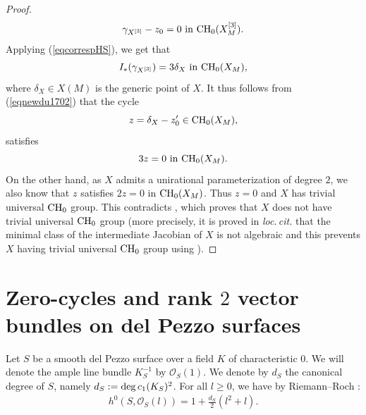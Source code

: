 \documentclass[10pt]{article}
\begin{document}
\begin{proof}
\begin{eqnarray}\label{eqnewdu1702} \gamma_{X^{[3]}}-z_0=0\,\,{\rm in}\,\,{\rm CH}_0(X^{[3]}_M).
\end{eqnarray}
Applying (\ref{eqcorrespHS}), we get that
$$I_*(\gamma_{X^{[3]}})=3\delta_X \,\,{\rm in}\,\,{\rm CH}_0(X_M),$$
where $\delta_X\in X(M)$ is the generic point of  $X$.
 It thus follows   from (\ref{eqnewdu1702})  that  the cycle
$$z=\delta_X-z'_0\in{\rm CH}_0(X_M),$$
  satisfies
$$3z=0\,\,{\rm in}\,\,{\rm CH}_0(X_M).$$ On the other hand, as $X$ admits a unirational parameterization of degree $2$, we also know that $z$ satisfies $2z=0$ in ${\rm CH}_0(X_M)$. Thus $z=0$ and $X$ has trivial universal ${\rm CH}_0$ group.
This contradicts \cite{SEggay}, which proves that $X$ does not have trivial universal ${\rm CH}_0$ group (more precisely, it is proved in {\it loc$.\,$cit.} that the minimal class of the intermediate Jacobian of $X$ is not algebraic and this prevents $X$  having trivial universal ${\rm CH}_0$ group using \cite{voisinjems}).
\end{proof}


\section{Zero-cycles and rank $2$ vector bundles on del Pezzo surfaces \label{secvb}}
Let $S$ be a smooth del Pezzo surface over a field $K$ of characteristic $0$. We will denote the ample  line bundle $K_S^{-1}$ by $\mathcal{O}_S(1)$.  We denote by $d_S$ the canonical degree of $S$, namely $d_S:={\rm deg}\,c_1(K_S)^2$.
 For all $l\geq 0$, we have by Riemann--Roch :
\begin{eqnarray}\label{eqRR} h^0(S,\mathcal{O}_S(l))=1+\frac{d_S}{2}(l^2+l).\end{eqnarray}
\end{document}
